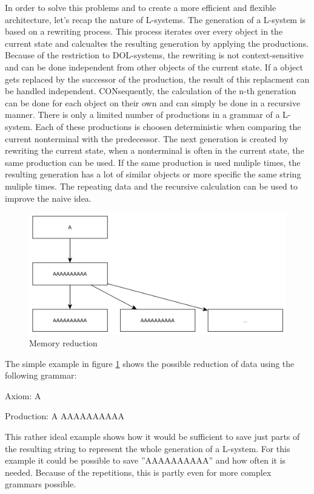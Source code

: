 \documentclass[english]{cpp-hmwk}
\begin{document}
\medskip
\noindent In order to solve this problems and to create a more efficient and flexible architecture, let's recap the nature of L-systems. The generation of a L-system is based on a rewriting process. This process iterates over every object in the current state and calcualtes the resulting generation by applying the productions. Because of the restriction to DOL-systems, the rewriting is not context-sensitive and can be done independent from other objects of the current state. If a object gets replaced by the successor of the production, the result of this replacment can be handled independent. CONsequently, the calculation of the n-th generation can be done for each object on their own and can simply be done in a recursive manner.\newline
There is only a limited number of productions in a grammar of a L-system. Each of these productions is choosen deterministic when comparing the current nonterminal with the predecessor. The next generation is created by rewriting the current state, when a nonterminal is often in the current state, the same production can be used. If the same production is used muliple times, the resulting generation has a lot of similar objects or more specific the same string muliple times. The repeating data and the recursive calculation can be used to improve the naive idea.

\medskip
\begin{figure}[h!]
	\centering
	\includegraphics[width=0.8\columnwidth]{../graphs/LSystem/examples/simple_grammar_data_doubling.png}
	\caption{Memory reduction}
	\label{figure:lsystem_mem_reduction}
\end{figure}

\noindent The simple example in figure \ref{figure:lsystem_mem_reduction} shows the possible reduction of data using the following grammar:

Axiom: A

Production: A \rightarrow AAAAAAAAAA 

\medskip
\noindent This rather ideal example shows how it would be sufficient to save just parts of the resulting string to represent the whole generation of a L-system. For this example it could be possible to save ''AAAAAAAAAA'' and how often it is needed. Because of the repetitions, this is partly even for more complex grammars possible.
\end{document}
